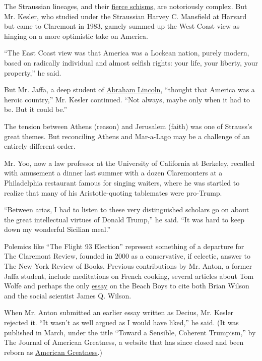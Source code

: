 The Straussian lineages, and their
\href{http://www.politico.com/magazine/story/2016/11/conservative-intellectuals-trump-2016-politics-policy-214424}{fierce
schisms}, are notoriously complex. But Mr. Kesler, who studied under the
Straussian Harvey C. Mansfield at Harvard but came to Claremont in 1983,
gamely summed up the West Coast view as hinging on a more optimistic
take on America.

``The East Coast view was that America was a Lockean nation, purely
modern, based on radically individual and almost selfish rights: your
life, your liberty, your property,'' he said.

But Mr. Jaffa, a deep student of
\href{http://press.uchicago.edu/ucp/books/book/chicago/C/bo6950926.html}{Abraham
Lincoln}, ``thought that America was a heroic country,'' Mr. Kesler
continued. ``Not always, maybe only when it had to be. But it could
be.''

The tension between Athens (reason) and Jerusalem (faith) was one of
Strauss's great themes. But reconciling Athens and Mar-a-Lago may be a
challenge of an entirely different order.

Mr. Yoo, now a law professor at the University of California at
Berkeley, recalled with amusement a dinner last summer with a dozen
Claremonters at a Philadelphia restaurant famous for singing waiters,
where he was startled to realize that many of his Aristotle-quoting
tablemates were pro-Trump.

``Between arias, I had to listen to these very distinguished scholars go
on about the great intellectual virtues of Donald Trump,'' he said. ``It
was hard to keep down my wonderful Sicilian meal.''

Polemics like ``The Flight 93 Election'' represent something of a
departure for The Claremont Review, founded in 2000 as a conservative,
if eclectic, answer to The New York Review of Books. Previous
contributions by Mr. Anton, a former Jaffa student, include meditations
on French cooking, several articles about Tom Wolfe and perhaps the only
\href{http://www.claremont.org/crb/article/paradise-lost-and-regained/}{essay}
on the Beach Boys to cite both Brian Wilson and the social scientist
James Q. Wilson.

When Mr. Anton submitted an earlier essay written as Decius, Mr. Kesler
rejected it. ``It wasn't as well argued as I would have liked,'' he
said. (It was published in March, under the title ``Toward a Sensible,
Coherent Trumpism,'' by The Journal of American Greatness, a website
that has since closed and been reborn as
\href{https://amgreatness.com/}{American Greatness}.)

